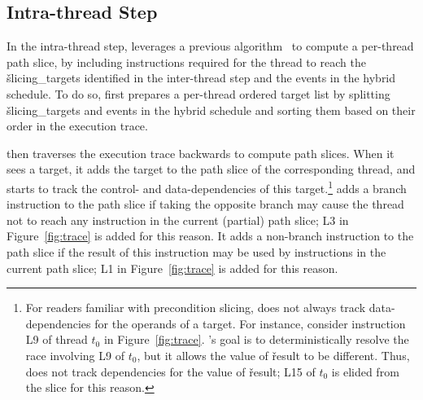 
\subsection{Intra-thread Step} \label{sec:intrathread-slice}


In the intra-thread step, \peregrine leverages a previous
algorithm~\cite{castro:bouncer} to compute a per-thread path slice,
by including instructions required for the thread to reach the
\v{slicing\_targets} identified in the inter-thread step and the events in
the hybrid schedule.  To do so, \peregrine first prepares a per-thread ordered
target list by splitting \v{slicing\_targets} and events in the hybrid
schedule and sorting them based on their order in the execution trace.

\peregrine then traverses the execution trace backwards to compute path slices.
When it sees a target, it adds the target to the path slice of the
corresponding thread, and starts to track the control- and
data-dependencies of this target.\footnote{For readers familiar with
  precondition slicing, \peregrine does not always track data-dependencies for
  the operands of a target.  For instance, consider instruction
  L9 of thread $t_0$ in Figure~\ref{fig:trace}.  \peregrine's goal is
  to deterministically resolve the race involving L9 of $t_0$, but it
  allows the value of \v{result} to be different.  Thus, \peregrine does not
  track dependencies for the value of \v{result}; L15 of $t_0$ is elided
  from the slice for this reason.}  \peregrine adds a branch
instruction to the path slice if taking the opposite branch may cause the
thread not to reach any instruction in the current (partial) path slice;
L3 in Figure~\ref{fig:trace} is added for this reason.
It adds a non-branch instruction to the path slice if the result of this
instruction may be used by instructions in the current path slice;
L1 in Figure~\ref{fig:trace} is added for this reason.

